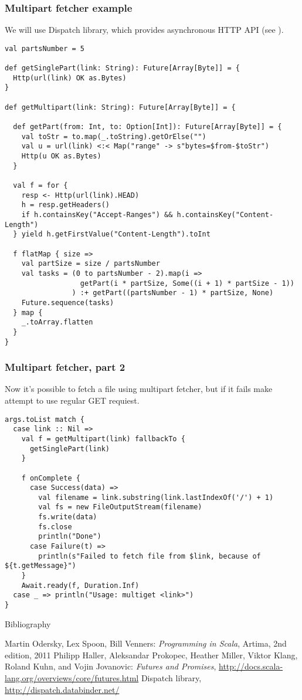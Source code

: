 \documentclass[t]{beamer}
\begin{document}
\begin{frame}[fragile]
\frametitle{Multipart fetcher example}
We will use Dispatch library, which provides asynchronous HTTP API (see \cite{dispatch}).
\begin{lstlisting}[name=multifetch]
val partsNumber = 5

def getSinglePart(link: String): Future[Array[Byte]] = {
  Http(url(link) OK as.Bytes)
}

def getMultipart(link: String): Future[Array[Byte]] = {

  def getPart(from: Int, to: Option[Int]): Future[Array[Byte]] = {
    val toStr = to.map(_.toString).getOrElse("")
    val u = url(link) <:< Map("range" -> s"bytes=$from-$toStr")
    Http(u OK as.Bytes)
  }

  val f = for {
    resp <- Http(url(link).HEAD)
    h = resp.getHeaders()
    if h.containsKey("Accept-Ranges") && h.containsKey("Content-Length")
  } yield h.getFirstValue("Content-Length").toInt

  f flatMap { size =>
    val partSize = size / partsNumber
    val tasks = (0 to partsNumber - 2).map(i =>
                  getPart(i * partSize, Some((i + 1) * partSize - 1))
                ) :+ getPart((partsNumber - 1) * partSize, None)
    Future.sequence(tasks)
  } map {
    _.toArray.flatten
  }
}
\end{lstlisting}
\end{frame}

\begin{frame}[fragile]
\frametitle{Multipart fetcher, part 2}
Now it's possible to fetch a file using multipart fetcher, but if it fails make attempt to use
regular GET requiest.
\begin{lstlisting}[name=multifetch]
args.toList match {
  case link :: Nil =>
    val f = getMultipart(link) fallbackTo {
      getSinglePart(link)
    } 
    
    f onComplete {
      case Success(data) =>
        val filename = link.substring(link.lastIndexOf('/') + 1)
        val fs = new FileOutputStream(filename)
        fs.write(data)
        fs.close
        println("Done")
      case Failure(t) =>
        println(s"Failed to fetch file from $link, because of ${t.getMessage}")
    }
    Await.ready(f, Duration.Inf)
  case _ => println("Usage: multiget <link>")
}
\end{lstlisting}
\end{frame}


\begin{frame}{Bibliography}
\begin{thebibliography}{00}
Martin Odersky, Lex Spoon, Bill Venners:
\emph{Programming in Scala},
Artima, 2nd edition, 2011
Philipp Haller, Aleksandar Prokopec, Heather Miller, Viktor Klang, Roland Kuhn, and Vojin Jovanovic:
\emph{Futures and Promises}, \url{http://docs.scala-lang.org/overviews/core/futures.html}
Dispatch library, \url{http://dispatch.databinder.net/}
\end{thebibliography}
\end{frame}


\end{document}
